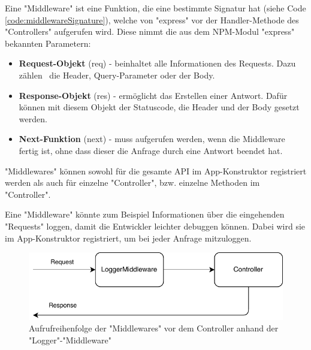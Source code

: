 \label{sec:middleware}

Eine "Middleware" ist eine Funktion, die eine bestimmte Signatur hat (siehe Code \ref{code:middlewareSignature}), welche von "express" vor der Handler-Methode des "Controllers" aufgerufen wird. 
Diese nimmt die aus dem NPM-Modul "express" bekannten Parametern:

    \begin{itemize}
        \item \textbf{Request-Objekt} ({\ttfamily req}) - beinhaltet alle Informationen des Requests. Dazu zählen \zb\ die Header, Query-Parameter oder der Body.
        \item \textbf{Response-Objekt} ({\ttfamily res}) - ermöglicht das Erstellen einer Antwort. Dafür können mit diesem Objekt der Statuscode, die Header und der Body gesetzt werden.
        \item \textbf{Next-Funktion} ({\ttfamily next}) - muss aufgerufen werden, wenn die Middleware fertig ist, ohne dass dieser die Anfrage durch eine Antwort beendet hat.
    \end{itemize}


"Middlewares" können sowohl für die gesamte API im App-Konstruktor registriert werden als auch für einzelne "Controller", bzw. einzelne Methoden im "Controller". 



Eine "Middleware" könnte zum Beispiel Informationen über die eingehenden "Requests" loggen, damit die Entwickler leichter debuggen können. Dabei wird sie im App-Konstruktor registriert, um bei jeder Anfrage mitzuloggen. 

\begin{figure}[H]
    \centering
    \includegraphics{media/APITemplate/LogMiddleware.svg.pdf}
    \caption{Aufrufreihenfolge der "Middlewares" vor dem Controller anhand der "Logger"-"Middleware"} 
\end{figure}


